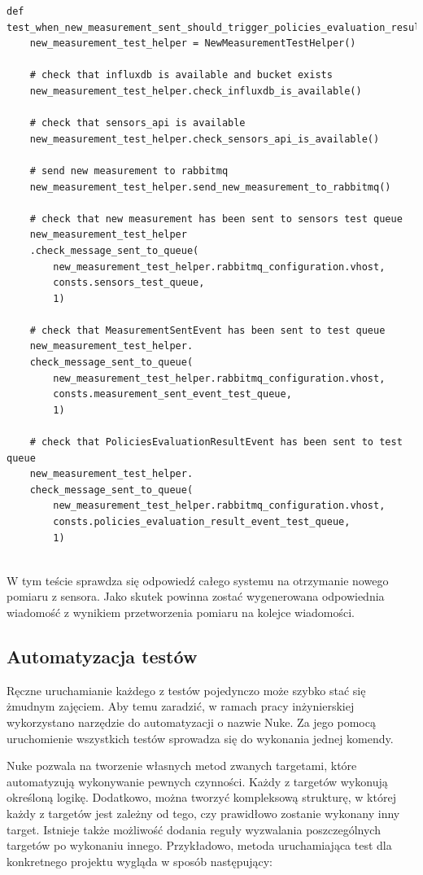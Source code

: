 \documentclass[11pt, a4]{article} %
\begin{document}
\begin{lstlisting}
def test_when_new_measurement_sent_should_trigger_policies_evaluation_result_event():
    new_measurement_test_helper = NewMeasurementTestHelper()

    # check that influxdb is available and bucket exists
    new_measurement_test_helper.check_influxdb_is_available()

    # check that sensors_api is available
    new_measurement_test_helper.check_sensors_api_is_available()

    # send new measurement to rabbitmq
    new_measurement_test_helper.send_new_measurement_to_rabbitmq()

    # check that new measurement has been sent to sensors test queue
    new_measurement_test_helper
    .check_message_sent_to_queue(
        new_measurement_test_helper.rabbitmq_configuration.vhost,
        consts.sensors_test_queue, 
        1)

    # check that MeasurementSentEvent has been sent to test queue  
    new_measurement_test_helper.
    check_message_sent_to_queue(
        new_measurement_test_helper.rabbitmq_configuration.vhost,
        consts.measurement_sent_event_test_queue, 
        1)

    # check that PoliciesEvaluationResultEvent has been sent to test queue
    new_measurement_test_helper.
    check_message_sent_to_queue(
        new_measurement_test_helper.rabbitmq_configuration.vhost,
        consts.policies_evaluation_result_event_test_queue, 
        1)


\end{lstlisting}

W tym teście sprawdza się odpowiedź całego systemu na otrzymanie nowego pomiaru 
z sensora. Jako skutek powinna zostać wygenerowana odpowiednia wiadomość z wynikiem 
przetworzenia pomiaru na kolejce wiadomości.

\subsection{Automatyzacja testów}

Ręczne uruchamianie każdego z testów pojedynczo może szybko stać się żmudnym zajęciem. 
Aby temu zaradzić, w ramach pracy inżynierskiej wykorzystano narzędzie do automatyzacji 
o nazwie Nuke. Za jego pomocą uruchomienie wszystkich testów sprowadza się do wykonania 
jednej komendy. 

Nuke pozwala na tworzenie własnych metod zwanych targetami, które automatyzują 
wykonywanie pewnych czynności. Każdy z targetów wykonują określoną logikę. 
Dodatkowo, można tworzyć kompleksową strukturę, w której każdy z targetów jest zależny 
od tego, czy prawidłowo zostanie wykonany inny target. Istnieje także możliwość 
dodania reguły wyzwalania poszczególnych targetów po wykonaniu innego. 
Przykładowo, metoda uruchamiająca test dla konkretnego projektu wygląda w sposób 
następujący:
\end{document}
